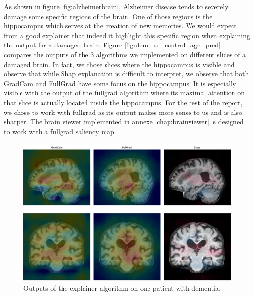 As shown in figure \ref{fig:alzheimerbrain}, Alzheimer disease tends to severely damage some specific regions of the brain. One of those regions is the hippocampus which serves at the creation of new memories. We would expect from a good explainer that indeed it highlight this specific region when explaining the output for a damaged brain. Figure \ref{fig:dem_vs_control_age_pred} compares the outputs of the 3 algorithms we implemented on different slices of a damaged brain. In fact, we chose slices where the hippocampus is visible and observe that while Shap explanation is difficult to interpret, we observe that both GradCam and FullGrad have some focus on the hippocampus. It is especially visible with the output of the fullgrad algorithm where its maximal attention on that slice is actually located inside the hippocampus. For the rest of the report, we chose to work with fullgrad as its output makes more sense to us and is also sharper. The brain viewer implemented in annexe \ref{chap:brainviewer} is designed to work with a fullgrad saliency map. 


\begin{figure}
    \centering
    \includegraphics[width=1\linewidth]{figures/Experiements/explainer_coparaison.pdf}
    \caption{Outputs of the explainer algorithm on one patient with dementia.}
    \label{fig:explainer_compared}
\end{figure}